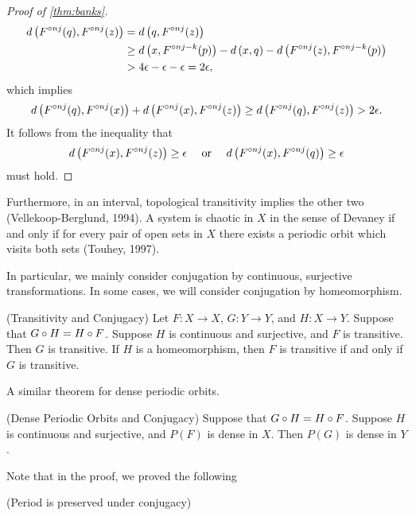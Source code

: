 \documentclass[12pt,draft,twoside]{book}
\begin{document}
\begin{proof}[Proof of \ref{thm:banks}]
\begin{align*}
    d\left( F^{\circ nj}(q), F^{\circ nj}(z) \right) 
    &= d\left( q, F^{\circ nj}(z) \right)  \\
    &\geq  d\left( x, F^{\circ nj-k}(p) \right) - d\left( x,q \right) - d\left( F^{\circ nj}(z), F^{\circ nj - k}(p) \right)  \\
    &> 4\epsilon - \epsilon - \epsilon 
    = 2\epsilon,
  \end{align*}
  which implies
  \begin{equation*}
    d\left( F^{\circ nj}(q), F^{\circ nj}(x) \right) + d\left( F^{\circ nj}(x), F^{\circ nj}(z) \right) 
    \geq d\left( F^{\circ nj}(q), F^{\circ nj}(z) \right)
    > 2\epsilon.
  \end{equation*}
  It follows from the inequality that 
  \begin{equation*}
    d\left( F^{\circ nj}(x), F^{\circ nj}(z) \right) \geq \epsilon \quad\mbox{ or }\quad d\left( F^{\circ nj}(x), F^{\circ nj}(q) \right) \geq \epsilon 
  \end{equation*}
   must hold.

\end{proof}

Furthermore, in an interval, topological transitivity implies the other two (Vellekoop-Berglund, 1994).
A system is chaotic in $X$ in the sense of Devaney if and only if for every pair of open sets in $X$ there exists a periodic orbit which visits both sets (Touhey, 1997).

In particular, we mainly consider conjugation by continuous, surjective transformations.
In some cases, we will consider conjugation by homeomorphism.
\begin{theorem}
  (Transitivity and Conjugacy) 
  Let $F: X \to X$, $G: Y \to Y$, and $H: X \to Y$.
  Suppose that $G \circ H = H \circ F$.
  Suppose $H$ is continuous and surjective, and $F$ is transitive.
  Then $G$ is transitive.
  If $H$ is a homeomorphism, then $F$ is transitive if and only if $G$ is transitive.
\end{theorem}
A similar theorem for dense periodic orbits.
\begin{theorem}
  (Dense Periodic Orbits and Conjugacy) 
  Suppose that $G \circ H = H \circ F$.
  Suppose $H$ is continuous and surjective, and $P(F)$ is dense in $X$.
  Then $P(G)$ is dense in $Y$.
\end{theorem}
Note that in the proof, we proved the following
\begin{theorem}
  (Period is preserved under conjugacy)
\end{theorem}




\printindex
\end{document}
